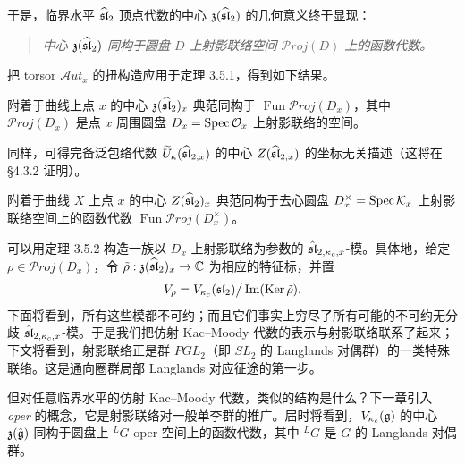 于是，临界水平 $\widehat{\mathfrak{sl}}_2$ 顶点代数的中心 $\mathfrak{z}(\widehat{\mathfrak{sl}}_2)$ 的几何意义终于显现：

\begin{quote}
    \itshape
    中心 $\mathfrak{z}(\widehat{\mathfrak{sl}}_2)$ 同构于圆盘 $D$ 上射影联络空间 $\mathcal{P}roj(D)$ 上的函数代数。
\end{quote}

把 torsor $\mathcal{A}ut_x$ 的扭构造应用于定理 3.5.1，得到如下结果。

\begin{theorem}
    附着于曲线上点 $x$ 的中心 $\mathfrak{z}(\widehat{\mathfrak{sl}}_2)_x$ 典范同构于 $\operatorname{Fun}\mathcal{P}roj(D_x)$，其中 $\mathcal{P}roj(D_x)$ 是点 $x$ 周围圆盘 $D_x=\operatorname{Spec}\mathcal{O}_x$ 上射影联络的空间。
\end{theorem}


同样，可得完备泛包络代数 $\widetilde{U}_\kappa(\widehat{\mathfrak{sl}}_{2,x})$ 的中心 $Z(\widehat{\mathfrak{sl}}_{2,x})$ 的坐标无关描述（这将在 §4.3.2 证明）。

\begin{corollary}
    附着于曲线 $X$ 上点 $x$ 的中心 $Z(\widehat{\mathfrak{sl}}_2)_x$ 典范同构于去心圆盘 $D_x^\times=\operatorname{Spec}\mathcal{K}_x$ 上射影联络空间上的函数代数 $\operatorname{Fun}\mathcal{P}roj(D_x^\times)$。
\end{corollary}

可以用定理 3.5.2 构造一族以 $D_x$ 上射影联络为参数的 $\hat{\mathfrak{sl}}_{2,\kappa_c,x}$-模。具体地，给定 $\rho\in\mathcal{P}roj(D_x)$，令 $\tilde\rho:\mathfrak{z}(\widehat{\mathfrak{sl}}_2)_x\to\mathbb{C}$ 为相应的特征标，并置
\[
    V_\rho=V_{\kappa_c}(\mathfrak{sl}_2)\big/\operatorname{Im}(\operatorname{Ker}\tilde\rho).
\]
下面将看到，所有这些模都不可约；而且它们事实上穷尽了所有可能的不可约无分歧 $\hat{\mathfrak{sl}}_{2,\kappa_c,x}$-模。于是我们把仿射 Kac–Moody 代数的表示与射影联络联系了起来；下文将看到，射影联络正是群 $PGL_2$（即 $SL_2$ 的 Langlands 对偶群）的一类特殊联络。这是通向圈群局部 Langlands 对应征途的第一步。


但对任意临界水平的仿射 Kac–Moody 代数，类似的结构是什么？下一章引入 \emph{oper} 的概念，它是射影联络对一般单李群的推广。届时将看到，$V_{\kappa_c}(\mathfrak{g})$ 的中心 $\mathfrak{z}(\hat{\mathfrak{g}})$ 同构于圆盘上 ${}^L G$-oper 空间上的函数代数，其中 ${}^L G$ 是 $G$ 的 Langlands 对偶群。
